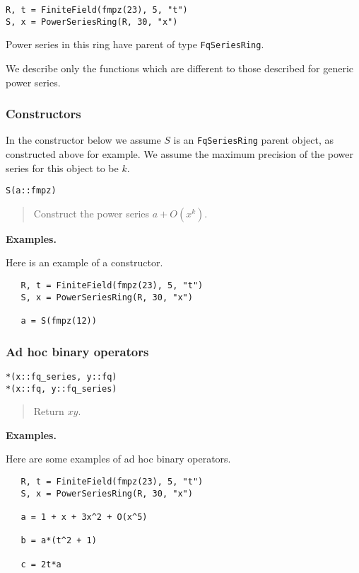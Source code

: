 \documentclass[a4paper,10pt]{article}
\newcommand{\code}{\lstinline}
\newcommand{\desc}[1]{\vspace{-3mm}\begin{quote}#1\end{quote}}
\begin{document}
{{\begin{lstlisting}
R, t = FiniteField(fmpz(23), 5, "t")
S, x = PowerSeriesRing(R, 30, "x")
\end{lstlisting}

Power series in this ring have parent of type \code{FqSeriesRing}.

We describe only the functions which are different to those described for generic
power series.

\subsubsection{Constructors}

In the constructor below we assume $S$ is an \code{FqSeriesRing} parent object, as
constructed above for example. We assume the maximum precision of the power series
for this object to be $k$.

\begin{lstlisting}
S(a::fmpz)
\end{lstlisting}

\desc{Construct the power series $a + O(x^k)$.}

\textbf{Examples.}

Here is an example of a constructor.

\begin{lstlisting}
   R, t = FiniteField(fmpz(23), 5, "t")
   S, x = PowerSeriesRing(R, 30, "x")

   a = S(fmpz(12))
\end{lstlisting}

\subsubsection{Ad hoc binary operators}

\begin{lstlisting}
*(x::fq_series, y::fq)
*(x::fq, y::fq_series)
\end{lstlisting}

\desc{Return $xy$.}

\textbf{Examples.}

Here are some examples of ad hoc binary operators.

\begin{lstlisting}
   R, t = FiniteField(fmpz(23), 5, "t")
   S, x = PowerSeriesRing(R, 30, "x")

   a = 1 + x + 3x^2 + O(x^5)
   
   b = a*(t^2 + 1)

   c = 2t*a
\end{lstlisting}

}}
\end{document}
